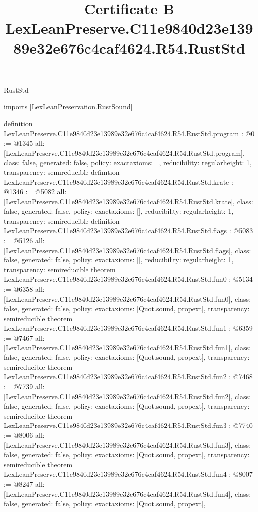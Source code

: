 \begin{lexlean}{RustStd}
\title{Certificate B LexLeanPreserve.C11e9840d23e13989e32e676c4caf4624.R54.RustStd}
\begin{coremodule}
imports [LexLeanPreservation.RustSound]

definition LexLeanPreserve.C11e9840d23e13989e32e676c4caf4624.R54.RustStd.program : @0 := @1345 {
  all: [LexLeanPreserve.C11e9840d23e13989e32e676c4caf4624.R54.RustStd.program],
  class: false,
  generated: false,
  policy: exact{axioms: []},
  reducibility: regular{height: 1},
  transparency: semireducible
}
definition LexLeanPreserve.C11e9840d23e13989e32e676c4caf4624.R54.RustStd.krate : @1346 := @5082 {
  all: [LexLeanPreserve.C11e9840d23e13989e32e676c4caf4624.R54.RustStd.krate],
  class: false,
  generated: false,
  policy: exact{axioms: []},
  reducibility: regular{height: 1},
  transparency: semireducible
}
definition LexLeanPreserve.C11e9840d23e13989e32e676c4caf4624.R54.RustStd.flags : @5083 := @5126 {
  all: [LexLeanPreserve.C11e9840d23e13989e32e676c4caf4624.R54.RustStd.flags],
  class: false,
  generated: false,
  policy: exact{axioms: []},
  reducibility: regular{height: 1},
  transparency: semireducible
}
theorem LexLeanPreserve.C11e9840d23e13989e32e676c4caf4624.R54.RustStd.fun0 : @5134 := @6358 {
  all: [LexLeanPreserve.C11e9840d23e13989e32e676c4caf4624.R54.RustStd.fun0],
  class: false,
  generated: false,
  policy: exact{axioms: [Quot.sound, propext]},
  transparency: semireducible
}
theorem LexLeanPreserve.C11e9840d23e13989e32e676c4caf4624.R54.RustStd.fun1 : @6359 := @7467 {
  all: [LexLeanPreserve.C11e9840d23e13989e32e676c4caf4624.R54.RustStd.fun1],
  class: false,
  generated: false,
  policy: exact{axioms: [Quot.sound, propext]},
  transparency: semireducible
}
theorem LexLeanPreserve.C11e9840d23e13989e32e676c4caf4624.R54.RustStd.fun2 : @7468 := @7739 {
  all: [LexLeanPreserve.C11e9840d23e13989e32e676c4caf4624.R54.RustStd.fun2],
  class: false,
  generated: false,
  policy: exact{axioms: [Quot.sound, propext]},
  transparency: semireducible
}
theorem LexLeanPreserve.C11e9840d23e13989e32e676c4caf4624.R54.RustStd.fun3 : @7740 := @8006 {
  all: [LexLeanPreserve.C11e9840d23e13989e32e676c4caf4624.R54.RustStd.fun3],
  class: false,
  generated: false,
  policy: exact{axioms: [Quot.sound, propext]},
  transparency: semireducible
}
theorem LexLeanPreserve.C11e9840d23e13989e32e676c4caf4624.R54.RustStd.fun4 : @8007 := @8247 {
  all: [LexLeanPreserve.C11e9840d23e13989e32e676c4caf4624.R54.RustStd.fun4],
  class: false,
  generated: false,
  policy: exact{axioms: [Quot.sound, propext]},
}
\end{coremodule}
\end{lexlean}
